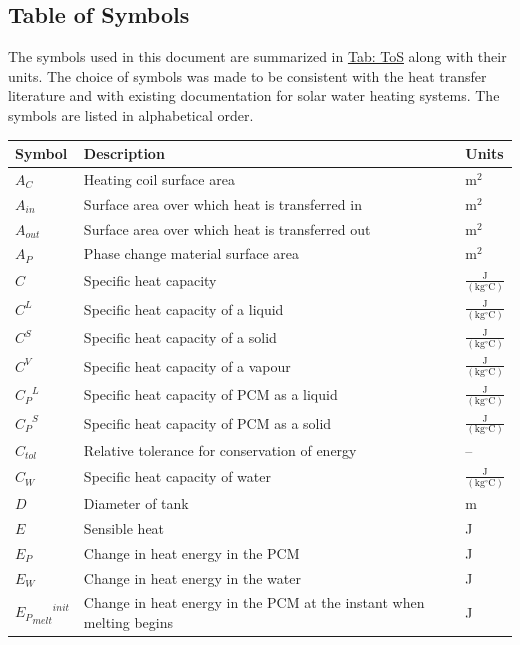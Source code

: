 \documentclass[12pt]{article}
\begin{document}
\subsection{Table of Symbols}
\label{Sec:ToS}
The symbols used in this document are summarized in \hyperref[Table:ToS]{Tab: ToS} along with their units. The choice of symbols was made to be consistent with the heat transfer literature and with existing documentation for solar water heating systems. The symbols are listed in alphabetical order.
\begin{longtabu}{l X[l] l}
\toprule
\textbf{Symbol} & \textbf{Description} & \textbf{Units}
\\
\midrule
\endhead
${A_{C}}$ & Heating coil surface area & $\text{m}^{2}$
\\
${A_{in}}$ & Surface area over which heat is transferred in & $\text{m}^{2}$
\\
${A_{out}}$ & Surface area over which heat is transferred out & $\text{m}^{2}$
\\
${A_{P}}$ & Phase change material surface area & $\text{m}^{2}$
\\
$C$ & Specific heat capacity & $\frac{\text{J}}{(\text{kg}{}^{\circ}\text{C})}$
\\
${C^{L}}$ & Specific heat capacity of a liquid & $\frac{\text{J}}{(\text{kg}{}^{\circ}\text{C})}$
\\
${C^{S}}$ & Specific heat capacity of a solid & $\frac{\text{J}}{(\text{kg}{}^{\circ}\text{C})}$
\\
${C^{V}}$ & Specific heat capacity of a vapour & $\frac{\text{J}}{(\text{kg}{}^{\circ}\text{C})}$
\\
${{C_{P}}^{L}}$ & Specific heat capacity of PCM as a liquid & $\frac{\text{J}}{(\text{kg}{}^{\circ}\text{C})}$
\\
${{C_{P}}^{S}}$ & Specific heat capacity of PCM as a solid & $\frac{\text{J}}{(\text{kg}{}^{\circ}\text{C})}$
\\
${C_{tol}}$ & Relative tolerance for conservation of energy & --
\\
${C_{W}}$ & Specific heat capacity of water & $\frac{\text{J}}{(\text{kg}{}^{\circ}\text{C})}$
\\
$D$ & Diameter of tank & m
\\
$E$ & Sensible heat & J
\\
${E_{P}}$ & Change in heat energy in the PCM & J
\\
${E_{W}}$ & Change in heat energy in the water & J
\\
${{{E_{P}}_{melt}}^{init}}$ & Change in heat energy in the PCM at the instant when melting begins & J

\end{longtabu}
\end{document}

